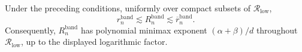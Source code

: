 Under the preceding conditions, uniformly over compact subsets of \(\mathcal{R}_{\mathrm{low}}\), \[r_n^{\mathrm{band}}\lesssim R_n^{\mathrm{band}}\lesssim\overline r_n^{\mathrm{band}}.\] Consequently, \(R_n^{\mathrm{band}}\) has polynomial minimax exponent \((\alpha+\beta)/d\) throughout \(\mathcal{R}_{\mathrm{low}}\), up to the displayed logarithmic factor.